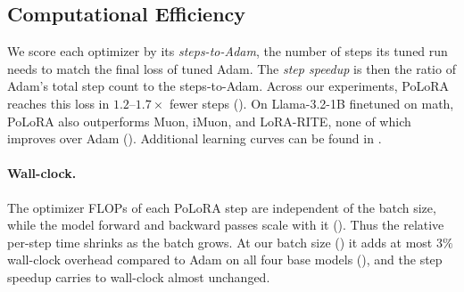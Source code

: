 \documentclass[11pt]{article}
\newcommand{\methodname}{PoLoRA\xspace}
\theoremstyle{plain}
\theoremstyle{definition}
\theoremstyle{remark}
\theoremstyle{definition}
\begin{document}
\subsection{Computational Efficiency}
\label{sec:exp-main}
We score each optimizer by its \emph{steps-to-Adam}, the number of steps its tuned run needs to match the final loss of tuned Adam. The \emph{step speedup} is then the ratio of Adam's total step count to the steps-to-Adam. Across our experiments, \methodname{} reaches this loss in $1.2$--$1.7\times$ fewer steps (). On Llama-3.2-1B finetuned on math, \methodname{} also outperforms Muon, iMuon, and LoRA-RITE, none of which improves over Adam (). Additional learning curves can be found in .



\paragraph{Wall-clock.}\label{sec:exp-walltime} The optimizer FLOPs of each \methodname{} step are independent of the batch size, while the model forward
and backward passes scale with it (). Thus the relative per-step time shrinks
as the batch grows. At our batch size () it adds at most $3\%$ wall-clock overhead compared to Adam on
all four base models (), and the step speedup carries to wall-clock almost
unchanged.  
\end{document}
